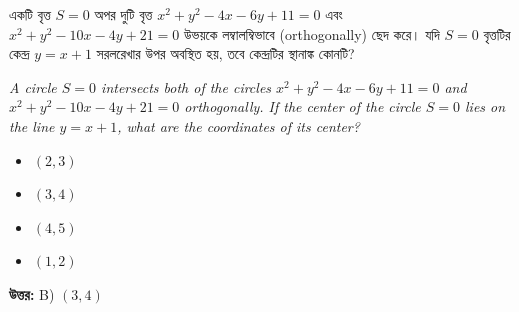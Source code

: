 \documentclass[12pt, a4paper]{article}
\begin{document}
\begin{tcolorbox}[questionbox={প্রশ্ন (Question) 13}]
    \noindent
    একটি বৃত্ত $S = 0$ অপর দুটি বৃত্ত $x^2 + y^2 - 4x - 6y + 11 = 0$ এবং $x^2 + y^2 - 10x - 4y + 21 = 0$ উভয়কে লম্বালম্বিভাবে (orthogonally) ছেদ করে। যদি $S = 0$ বৃত্তটির কেন্দ্র $y = x + 1$ সরলরেখার উপর অবস্থিত হয়, তবে কেন্দ্রটির স্থানাঙ্ক কোনটি?
    
    \vspace{0.8em}
    \begin{english}
    \noindent\textit{\color{darkgray}
    A circle $S = 0$ intersects both of the circles $x^2 + y^2 - 4x - 6y + 11 = 0$ and $x^2 + y^2 - 10x - 4y + 21 = 0$ orthogonally. If the center of the circle $S = 0$ lies on the line $y = x + 1$, what are the coordinates of its center?
    }
    \end{english}
\end{tcolorbox}

\vspace{1em}
\begin{itemize}[label={}, leftmargin=1cm, itemsep=0.5em]
    \item[\textbf{A)}] $(2, 3)$
    \item[\textbf{B)}] $(3, 4)$
    \item[\textbf{C)}] $(4, 5)$
    \item[\textbf{D)}] $(1, 2)$
\end{itemize}

\vspace{0.5em}
\begin{tcolorbox}[answerbox]
    \textbf{\color{success} উত্তর:} B) $(3, 4)$
\end{tcolorbox}
\vspace{1em}
\end{document}

